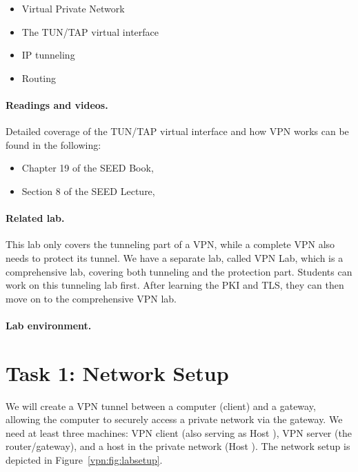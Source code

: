 \begin{itemize}[noitemsep]
\item Virtual Private Network
\item The TUN/TAP virtual interface 
\item IP tunneling 
\item Routing
\end{itemize}


\paragraph{Readings and videos.}
Detailed coverage of the TUN/TAP virtual interface and how 
VPN works can be found in the following:

\begin{itemize}
\item Chapter 19 of the SEED Book, \seedbook
\item Section 8 of the SEED Lecture, \seedisvideo
\end{itemize}


\paragraph{Related lab.}
This lab only covers the tunneling part of a VPN, while 
a complete VPN also needs to protect its tunnel. 
We have a separate lab, called VPN Lab, which
is a comprehensive lab, covering both tunneling and 
the protection part. Students can work on this tunneling
lab first. After learning the PKI and TLS, 
they can then move on to the comprehensive VPN lab.


\paragraph{Lab environment.} \seedenvironmentB




\newpage
\section{Task 1: Network Setup }


We will create a VPN tunnel between a 
computer (client) and a gateway, allowing the computer to securely access 
a private network via the gateway. 
We need at least three machines: VPN client (also serving as Host \hostu), 
VPN server (the router/gateway), and a host in the private network (Host \hostv). 
The network setup is depicted in 
Figure~\ref{vpn:fig:labsetup}.


